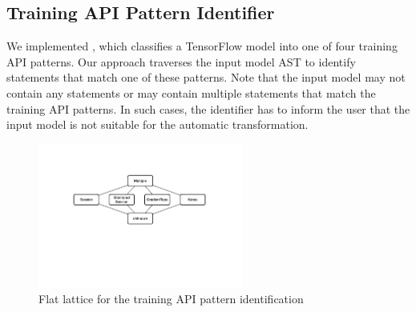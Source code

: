 
\subsection{Training API Pattern Identifier}\label{sec:ident}
We implemented \tapi, which classifies a TensorFlow model into one of four
training API patterns. 
Our approach traverses the input model AST to identify statements that match
one of these patterns. 
Note that the input model may not contain any statements or may contain
multiple statements that match the training API patterns. 
In such cases, the identifier has to inform the user that the input model is
not suitable for the automatic transformation.

\begin{figure}[ht!]
  \centering
  \includegraphics[width=0.6\textwidth]{lattice.pdf}
  \caption{Flat lattice for the training API pattern identification}
  \label{fig:pattern:lattice}
\end{figure}

